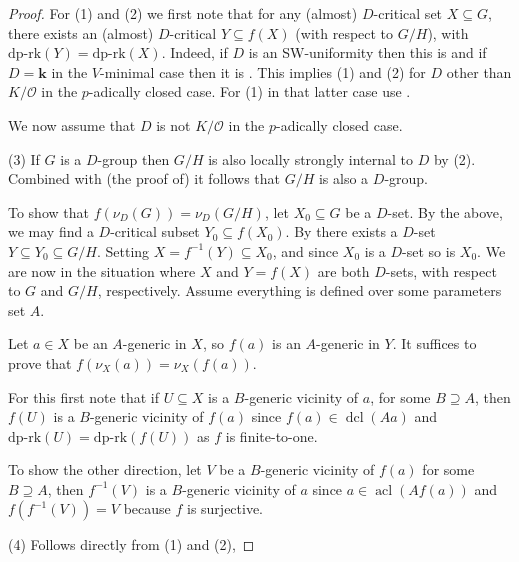 \documentclass[11pt]{amsart}
\DeclareMathOperator{\acl}{acl}
\DeclareMathOperator{\dcl}{dcl} \DeclareMathOperator{\gr}{Gr}
\theoremstyle{definition}
\newcommand{\bk}{\textbf{k}}
\newcommand{\CO}{{\mathcal O}}
\newcommand{\0}{\emptyset}
\def\dpr{\mathrm{dp\text{-}rk}}
\def\sub{\subseteq}
\begin{document}
\begin{proof} 

For (1) and  (2) we first note that  for any (almost) $D$-critical set $X\subseteq G$, there exists an (almost) $D$-critical  $Y\subseteq f(X)$ (with respect to $G/H$), with $\dpr(Y)=\dpr(X)$. Indeed, if $D$ is an SW-uniformity then this is \cite[Lemma 2.9]{HaHaPeGps} and if $D=\bk$ in the $V$-minimal case then it is \cite[Lemma 4.3]{HaHaPeGps}.  This implies (1) and (2)  for $D$ other than  $K/\CO$ in the $p$-adically closed case.  For (1) in that latter case use \cite[Lemma 3.9]{HaHaPeGps}.

We now assume that $D$ is not $K/\CO$ in the $p$-adically closed case.

(3) If $G$ is a $D$-group then $G/H$ is also locally strongly internal to $D$ by (2). Combined with (the proof of) \cite[Fact 4.25]{HaHaPeGps}  it  follows that $G/H$ is also a $D$-group.

To show that $f(\nu_{D}(G))=\nu_{D}(G/H)$, let $X_0\subseteq G$ be a $D$-set. By the above, we may find a $D$-critical subset $Y_0\subseteq f(X_0)$. By \cite[Remark 4.18]{HaHaPeGps} there exists a $D$-set $Y\subseteq Y_0\subseteq G/H$. Setting $X=f^{-1}(Y)\subseteq X_0$,  and since $X_0$ is a $D$-set so is $X_0$. We are now in the situation where $X$ and $Y=f(X)$ are both $D$-sets, with respect to $G$ and $G/H$, respectively. Assume everything is defined over some parameters set $A$.

Let $a\in X$ be an $A$-generic in $X$, so $f(a)$ is an $A$-generic in $Y$. It suffices to prove that $f(\nu_X(a))=\nu_X(f(a))$.


For this first note that if $U\sub X$ is a $B$-generic vicinity of $a$, for some $B\supseteq A$, then $f(U)$ is a $B$-generic vicinity of $f(a)$ since $f(a)\in \dcl(Aa)$ and $\dpr(U)=\dpr(f(U))$ as $f$ is finite-to-one.

To show the other direction, let $V$ be a $B$-generic vicinity of $f(a)$ for some $B\supseteq A$, then $f^{-1}(V)$ is a $B$-generic vicinity of $a$ since $a\in\acl(Af(a))$ and $f(f^{-1}(V))=V$ because $f$ is surjective.

(4) Follows directly from (1) and (2),
%
\end{proof}
\end{document}
